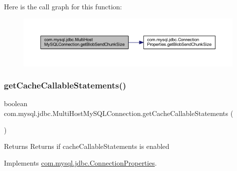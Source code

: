 Here is the call graph for this function\+:
\nopagebreak
\begin{figure}[H]
\begin{center}
\leavevmode
\includegraphics[width=350pt]{classcom_1_1mysql_1_1jdbc_1_1_multi_host_my_s_q_l_connection_a699c99bdf14c617415353b9f1f001efa_cgraph}
\end{center}
\end{figure}
\mbox{\label{classcom_1_1mysql_1_1jdbc_1_1_multi_host_my_s_q_l_connection_a9b0ddb53d65156d1f2866033305d5214}} 
\subsubsection{\texorpdfstring{get\+Cache\+Callable\+Statements()}{getCacheCallableStatements()}}
{\footnotesize\ttfamily boolean com.\+mysql.\+jdbc.\+Multi\+Host\+My\+S\+Q\+L\+Connection.\+get\+Cache\+Callable\+Statements (\begin{DoxyParamCaption}{ }\end{DoxyParamCaption})}

\begin{DoxyReturn}{Returns}
Returns if cache\+Callable\+Statements is enabled 
\end{DoxyReturn}


Implements \mbox{\hyperlink{interfacecom_1_1mysql_1_1jdbc_1_1_connection_properties_a24408439f0eeff0fd5181509fa6b68d0}{com.\+mysql.\+jdbc.\+Connection\+Properties}}.

